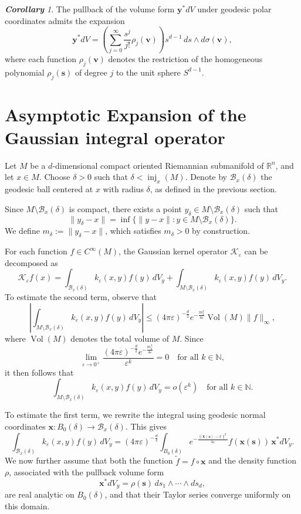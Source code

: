 \documentclass{amsart}
\theoremstyle{Theorem}
\theoremstyle{remark}
\newtheorem{cor}{\bf Corollary}[section]
\numberwithin{equation}{section} \numberwithin{figure}{section}
\renewcommand*{\to}{\rightarrow}
\begin{document}
\begin{cor}
The pullback of the volume form \( \mathbf{y}^* dV \) under geodesic polar coordinates admits the expansion
\[
\mathbf{y}^* dV = \left( \sum_{j=0}^{\infty} \frac{s^j}{j!} \rho_j(\mathbf{v}) \right) s^{d-1} \, ds \wedge d\sigma(\mathbf{v}),
\]
where each function \( \rho_j(\mathbf{v}) \) denotes the restriction of the homogeneous polynomial \( \rho_j(\mathbf{s}) \) of degree \( j \) to the unit sphere \( S^{d-1} \).
\end{cor}




\section{Asymptotic Expansion of the Gaussian integral operator}
Let \( M \) be a \( d \)-dimensional compact oriented Riemannian submanifold of \( \mathbb{R}^n \), and let \( x \in M \). Choose \( \delta > 0 \) such that \( \delta < \operatorname{inj}_x(M) \). Denote by \( \mathcal{B}_x(\delta) \) the geodesic ball centered at \( x \) with radius \( \delta \), as defined in the previous section.

Since \( M \setminus \mathcal{B}_x(\delta) \) is compact, there exists a point \( y_\delta \in M \setminus \mathcal{B}_x(\delta) \) such that
\[
\| y_\delta - x \| = \inf \{ \| y - x \| : y \in M \setminus \mathcal{B}_x(\delta) \}.
\]
We define \( m_\delta := \| y_\delta - x \| \), which satisfies \( m_\delta > 0 \) by construction.

For each function \( f \in C^\infty(M) \), the Gaussian kernel operator \( \mathcal{K}_\varepsilon \) can be decomposed as
\[
\mathcal{K}_\varepsilon f(x) = \int_{\mathcal{B}_x(\delta)} k_\varepsilon(x, y) f(y) \, dV_y + \int_{M \setminus \mathcal{B}_x(\delta)} k_\varepsilon(x, y) f(y) \, dV_y.
\]
To estimate the second term, observe that
\[
\left| \int_{M \setminus \mathcal{B}_x(\delta)} k_\varepsilon(x, y) f(y) \, dV_y \right| \leq (4\pi\varepsilon)^{-\frac{d}{2}}e^{-\frac{m_\delta^{2}}{4\varepsilon}} \operatorname{Vol}(M) \| f \|_\infty,
\]
where \( \operatorname{Vol}(M) \) denotes the total volume of \( M \). Since 
\[
\lim_{\varepsilon \to 0^+} \frac{(4\pi\varepsilon)^{-\frac{d}{2}}e^{-\frac{m_\delta^{2}}{4\varepsilon}}}{\varepsilon^k} = 0 \quad \text{for all } k \in \mathbb{N},
\]
it then follows that
\[
\int_{M \setminus \mathcal{B}_x(\delta)} k_\varepsilon(x, y) f(y) \, dV_y = o(\varepsilon^k)
\quad \text{for all } k \in \mathbb{N}.
\]

To estimate the first term, we rewrite the integral using geodesic normal coordinates 
\( \mathbf{x} : B_0(\delta) \to \mathcal{B}_x(\delta) \). This gives
\[
\int_{\mathcal{B}_x(\delta)} k_\varepsilon(x, y) f(y) \, dV_y 
= (4\pi\varepsilon)^{-\frac{d}{2}} \int_{B_0(\delta)} e^{-\frac{\| \mathbf{x}(\mathbf{s}) - x \|^2}{4\varepsilon}} 
f(\mathbf{x}(\mathbf{s})) \, \mathbf{x}^* dV_y.
\]
We now further assume that both the function \( \widetilde{f} = f \circ \mathbf{x} \) and the density function \( \rho \), associated with the pullback volume form
\[
\mathbf{x}^* dV_y = \rho(\mathbf{s}) \, ds_{1} \wedge \cdots \wedge ds_{d},
\]
are real analytic on \( B_0(\delta) \), and that their Taylor series converge uniformly on this domain.
\end{document}
